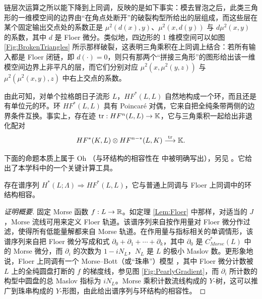 链层次运算之所以能下降到上同调，反映的是如下事实：模去冒泡之后，此类三角形的一维模空间的边界由“在角点处断开”的破裂构型所给出的层组成，而这些层在某个固定输出交点处的系数正是 $\mu^2(d(x),y)$、$\mu^2(x,d(y))$ 与 $d\mu^2(x,y)$ 的系数，其中 $d$ 是 Floer 微分。类似地，四边形的 1 维模空间可以如图 \ref{Fig:BrokenTriangles} 所示那样破裂，这表明三角乘积在上同调上结合：若所有输入都是 Floer 闭链，即 $d(\cdot) = 0$，则只有那两个“拼接三角形”的图形给出该一维模空间边界上非平凡的层，而它们分别对应 $\mu^2(x,\mu^2(y,z))$ 与 $\mu^2(\mu^2(x,y),z)$ 中右上交点的系数。

由此可知，对单个拉格朗日子流形 $L$，$HF^*(L,L)$ 自然地构成一个环，而且还是有单位元的环。环 $HF^*(L,L)$ 具有 Poincaré 对偶，它来自把全纯条带两侧的边界条件互换。事实上，存在迹 $\mathrm{tr}: HF^{n}(L,L) \rightarrow \mathbb{K}$，它与三角乘积一起给出非退化配对
\[
HF^*(K,L) \otimes HF^{n-*}(L,K) \stackrel{\mathrm{tr}}{\longrightarrow} \mathbb{K}.
\]

下面的命题本质上属于 Oh \cite{Oh:Thomas}（与环结构的相容性在 \cite{Buhovski:ring} 中被明确写出），另见 \cite{Albers,BiranCornea}。它给出了本学科中的一个关键计算工具。

\begin{Proposition}\label{Lem:Oh}
存在谱序列 $H^*(L;\Lambda) \Rightarrow HF^*(L,L)$，它与普通上同调与 Floer 上同调中的环结构相容。
\end{Proposition}

\begin{proof}[证明概要]
固定 Morse 函数 $f: L \rightarrow \mathbb{R}$。如定理 \ref{Lem:Floer} 中那样，对适当的 $J$，Morse 流线可用来定义 Floer 轨道。该谱序列来自按作用量对 Floer 微分作过滤，使得所有低能量解都来自 Morse 轨道。在作用量与指标相关的单调情形，该谱序列来自把 Floer 微分写成和式 $\partial_0 + \partial_1 + \cdots + \partial_k$，其中 $\partial_0$ 是 $C^*_{Morse}(L)$ 中的 Morse 微分，而 $\partial_i$ 的次数为 $1-iN_L$，$N_L$ 是 $L$ 的极小 Maslov 数。更形象地说，Floer 上同调有一个 Morse–Bott（或“珠串”）模型 \cite{BiranCornea}，其中 Floer 微分计数被 $L$ 上的全纯圆盘打断的 $f$ 的梯度线，参见图 \ref{Fig:PearlyGradient}，而 $\partial_i$ 所计数的构型中圆盘的总 Maslov 指标为 $iN_L$。Morse 乘积计数流线构成的 $Y$-树，这可以推广到珠串构成的 $Y$-形图，由此给出谱序列与环结构的相容性。
\end{proof}

